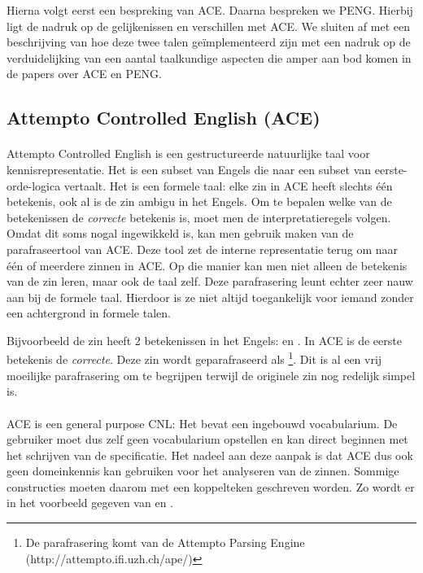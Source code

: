 Hierna volgt eerst een bespreking van ACE. Daarna bespreken we PENG. Hierbij ligt de nadruk op de gelijkenissen en verschillen met ACE. We sluiten af met een beschrijving van hoe deze twee talen ge\"implementeerd zijn met een nadruk op de verduidelijking van een aantal taalkundige aspecten die amper aan bod komen in de papers over ACE en PENG.

\subsection{Attempto Controlled English (ACE)}
\paragraph{} Attempto Controlled English \cite{Fuchs2008} is een gestructureerde natuurlijke taal voor kennisrepresentatie. Het is een subset van Engels die naar een subset van eerste-orde-logica vertaalt. Het is een formele taal: elke zin in ACE heeft slechts \'e\'en betekenis, ook al is de zin ambigu in het Engels. Om te bepalen welke van de betekenissen de \textit{correcte} betekenis is, moet men de interpretatieregels volgen. Omdat dit soms nogal ingewikkeld is, kan men gebruik maken van de parafraseertool van ACE. Deze tool zet de interne representatie terug om naar \'e\'en of meerdere zinnen in ACE. Op die manier kan men niet alleen de betekenis van de zin leren, maar ook de taal zelf. Deze parafrasering leunt echter zeer nauw aan bij de formele taal. Hierdoor is ze niet altijd toegankelijk voor iemand zonder een achtergrond in formele talen.

Bijvoorbeeld de zin  heeft 2 betekenissen in het Engels:  en . In ACE is de eerste betekenis de \textit{correcte}. Deze zin wordt geparafraseerd als  \footnote{De parafrasering komt van de Attempto Parsing Engine (http://attempto.ifi.uzh.ch/ape/)}. Dit is al een vrij moeilijke parafrasering om te begrijpen terwijl de originele zin nog redelijk simpel is.

\paragraph{}ACE is een general purpose CNL: Het bevat een ingebouwd vocabularium. De gebruiker moet dus zelf geen vocabularium opstellen en kan direct beginnen met het schrijven van de specificatie. Het nadeel aan deze aanpak is dat ACE dus ook geen domeinkennis kan gebruiken voor het analyseren van de zinnen. Sommige constructies moeten daarom met een koppelteken geschreven worden. Zo wordt er in \cite{ACEConstructionRules} het voorbeeld gegeven van  en .


